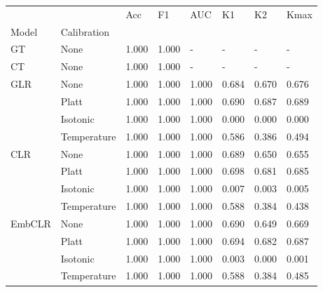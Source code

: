 \begin{tabular}{llllllll}
\toprule
 &  & Acc & F1 & AUC & K1 & K2 & Kmax \\
Model & Calibration &  &  &  &  &  &  \\
\midrule
GT & None & 1.000 & 1.000 & - & - & - & - \\
\cline{1-8}
CT & None & 1.000 & 1.000 & - & - & - & - \\
\cline{1-8}
\multirow[t]{4}{*}{GLR} & None & 1.000 & 1.000 & 1.000 & 0.684 & 0.670 & 0.676 \\
 & Platt & 1.000 & 1.000 & 1.000 & 0.690 & 0.687 & 0.689 \\
 & Isotonic & 1.000 & 1.000 & 1.000 & 0.000 & 0.000 & 0.000 \\
 & Temperature & 1.000 & 1.000 & 1.000 & 0.586 & 0.386 & 0.494 \\
\cline{1-8}
\multirow[t]{4}{*}{CLR} & None & 1.000 & 1.000 & 1.000 & 0.689 & 0.650 & 0.655 \\
 & Platt & 1.000 & 1.000 & 1.000 & 0.698 & 0.681 & 0.685 \\
 & Isotonic & 1.000 & 1.000 & 1.000 & 0.007 & 0.003 & 0.005 \\
 & Temperature & 1.000 & 1.000 & 1.000 & 0.588 & 0.384 & 0.438 \\
\cline{1-8}
\multirow[t]{4}{*}{EmbCLR} & None & 1.000 & 1.000 & 1.000 & 0.690 & 0.649 & 0.669 \\
 & Platt & 1.000 & 1.000 & 1.000 & 0.694 & 0.682 & 0.687 \\
 & Isotonic & 1.000 & 1.000 & 1.000 & 0.003 & 0.000 & 0.001 \\
 & Temperature & 1.000 & 1.000 & 1.000 & 0.588 & 0.384 & 0.485 \\
\cline{1-8}
\bottomrule
\end{tabular}
